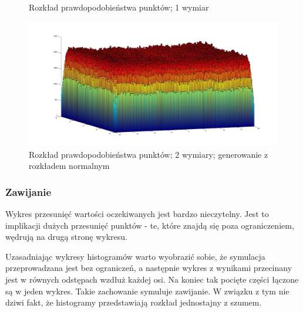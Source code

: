 \documentclass{mini}
\begin{document}
\begin{figure}[H]
\centering
{}
\quad
{}
\caption{Rozkład prawdopodobieństwa punktów; 1 wymiar}
\end{figure}

\begin{figure}[H]
\centering
\includegraphics[width=\textwidth]{s_n_10M_2__20_20__10_10_4_2}
\caption{Rozkład prawdopodobieństwa punktów; 2 wymiary; generowanie z rozkładem normalnym}
\end{figure}

\subsubsection*{Zawijanie}
Wykres przesunięć wartości oczekiwanych jest bardzo nieczytelny. Jest to implikacji dużych przesunięć punktów - te, które znajdą się poza ograniczeniem, wędrują na drugą stronę wykresu.

Uzasadniając wykresy histogramów warto wyobrazić sobie, że symulacja przeprowadzana jest bez ograniczeń, a następnie wykres z wynikami przecinany jest w równych odstępach wzdłuż każdej osi. Na koniec tak pocięte części łączone są w jeden wykres. Takie zachowanie symuluje zawijanie. W związku z tym nie dziwi fakt, że histogramy przedstawiają rozkład jednostajny z szumem.
\end{document}
